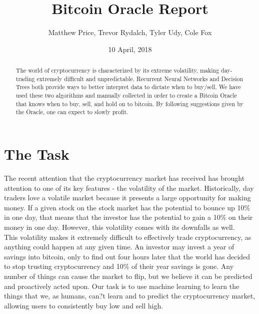 \documentclass{article}
\begin{document}
\lstset{
  language=Python,
  basicstyle=\small,          %
  keywordstyle=\bfseries,
  identifierstyle=,           %
  commentstyle=,              %
  stringstyle=\ttfamily,      %
  showstringspaces=false,     %
  numbers=left,
  numberstyle=\tiny,
  numbersep=5pt,
  frame=tb,
}

\title{Bitcoin Oracle Report}

\author{Matthew Price, Trevor Rydalch, Tyler Udy, Cole Fox}

\date{10 April, 2018}

\maketitle

\begin{abstract}  
The world of cryptocurrency is characterized by its extreme volatility, making day-trading extremely difficult and unpredictable. Recurrent Neural Networks and Decision Trees both provide ways to better interpret data to dictate when to buy/sell. We have used these two algorithms and manually collected in order to create a Bitcoin Oracle that knows when to buy, sell, and hold on to bitcoin. By following suggestions given by the Oracle, one can expect to slowly profit.
\end{abstract}

\section{ The Task }
The recent attention that the cryptocurrency market has received has brought attention to one of its key features - the volatility of the market. Historically, day traders love a volatile market because it presents a large opportunity for making money. If a given stock on the stock market has the potential to bounce up 10\% in one day, that means that the investor has the potential to gain a 10\% on their money in one day. However, this volatility comes with its downfalls as well. \\

 This volatility makes it extremely difficult to effectively trade cryptocurrency, as anything could happen at any given time. An investor may invest a year of savings into bitcoin, only to find out four hours later that the world has decided to stop trusting cryptocurrency and 10\% of their year savings is gone. Any number of things can cause the market to flip, but we believe it can be predicted and proactively acted upon. Our task is to use machine learning to learn the things that we, as humans, can?t learn and to predict the cryptocurrency market, allowing users to consistently buy low and sell high. \\
\end{document}
